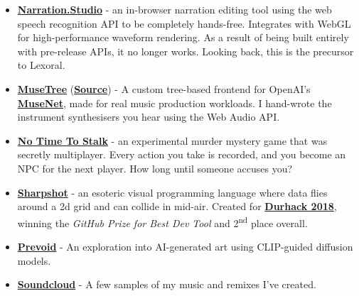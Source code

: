 \documentclass[hidelinks, 12pt, a4paper]{article}
\begin{document}
	\begin{itemize}
		\item \begin{small}\href{https://github.com/stevenwaterman/narration.studio}{\textbf{Narration.Studio}} - an in-browser narration editing tool using the web speech recognition API to be completely hands-free. Integrates with WebGL for high-performance waveform rendering. As a result of being built entirely with pre-release APIs, it no longer works. Looking back, this is the precursor to Lexoral.\end{small}
		
		\item \begin{small} \href{https://stevenwaterman.uk/musetree/}{\textbf{MuseTree}} (\href{https://github.com/stevenwaterman/musetree}{\textbf{Source}}) - A custom tree-based frontend for OpenAI's \href{https://openai.com/blog/musenet/}{\textbf{MuseNet}}, made for real music production workloads. I hand-wrote the instrument synthesisers you hear using the Web Audio API.\end{small}
		
		\item \begin{small}\href{https://github.com/stevenwaterman/NoTimeToStalk}{\textbf{No Time To Stalk}} - an experimental murder mystery game that was secretly multiplayer. Every action you take is recorded, and you become an NPC for the next player. How long until someone accuses you?\end{small}
		
		\item \begin{small}\href{https://github.com/stevenwaterman/sharpshot}{\textbf{Sharpshot}} - an esoteric visual programming language where data flies around a 2d grid and can collide in mid-air. Created for \href{http://www.durhack.com}{\textbf{Durhack 2018}}, winning the \emph{GitHub Prize for Best Dev Tool} and 2\textsuperscript{nd} place overall.\end{small}
		
		\item \begin{small}\href{https://linktr.ee/prevoid_art}{\textbf{Prevoid}} - An exploration into AI-generated art using CLIP-guided diffusion models.\end{small}
		
		\item \begin{small}\href{https://soundcloud.com/user-872603169/welcome-to-the-theatre}{\textbf{Soundcloud}} - A few samples of my music and remixes I've created.\end{small}
	\end{itemize}
\end{document}
